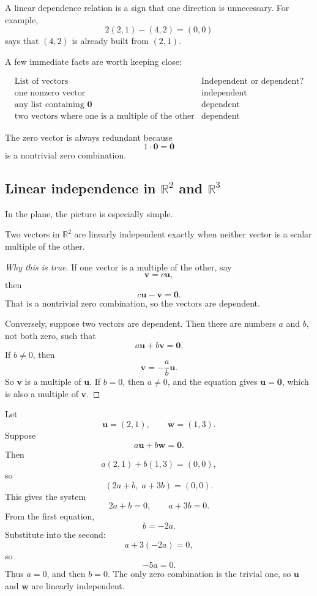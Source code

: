 A linear dependence relation is a sign that one direction is unnecessary.  For example,
\[
    2(2,1)-(4,2)=(0,0)
\]
says that \((4,2)\) is already built from \((2,1)\).

A few immediate facts are worth keeping close:

\[
\begin{array}{c|c}
\text{List of vectors} & \text{Independent or dependent?} \\ \hline
\text{one nonzero vector} & \text{independent} \\
\text{any list containing } \mathbf 0 & \text{dependent} \\
\text{two vectors where one is a multiple of the other} & \text{dependent}
\end{array}
\]

The zero vector is always redundant because
\[
    1\cdot \mathbf 0=\mathbf 0
\]
is a nontrivial zero combination.

\subsection{Linear independence in \(\mathbb R^2\) and \(\mathbb R^3\)}

In the plane, the picture is especially simple.

\begin{theorem}
Two vectors in \(\mathbb R^2\) are linearly independent exactly when neither vector is
a scalar multiple of the other.
\end{theorem}

\begin{proof}[Why this is true]
If one vector is a multiple of the other, say
\[
    \mathbf v=c\mathbf u,
\]
then
\[
    c\mathbf u-\mathbf v=\mathbf 0.
\]
That is a nontrivial zero combination, so the vectors are dependent.

Conversely, suppose two vectors are dependent.  Then there are numbers \(a\) and \(b\),
not both zero, such that
\[
    a\mathbf u+b\mathbf v=\mathbf 0.
\]
If \(b\neq 0\), then
\[
    \mathbf v=-\frac{a}{b}\mathbf u.
\]
So \(\mathbf v\) is a multiple of \(\mathbf u\).  If \(b=0\), then \(a\neq 0\), and the
equation gives \(\mathbf u=\mathbf 0\), which is also a multiple of \(\mathbf v\).
\end{proof}

\begin{example}
Let
\[
    \mathbf u=(2,1),\qquad \mathbf w=(1,3).
\]
Suppose
\[
    a\mathbf u+b\mathbf w=\mathbf 0.
\]
Then
\[
    a(2,1)+b(1,3)=(0,0),
\]
so
\[
    (2a+b,\;a+3b)=(0,0).
\]
This gives the system
\[
    2a+b=0,\qquad a+3b=0.
\]
From the first equation,
\[
    b=-2a.
\]
Substitute into the second:
\[
    a+3(-2a)=0,
\]
so
\[
    -5a=0.
\]
Thus \(a=0\), and then \(b=0\).  The only zero combination is the trivial one, so
\(\mathbf u\) and \(\mathbf w\) are linearly independent.
\end{example}

